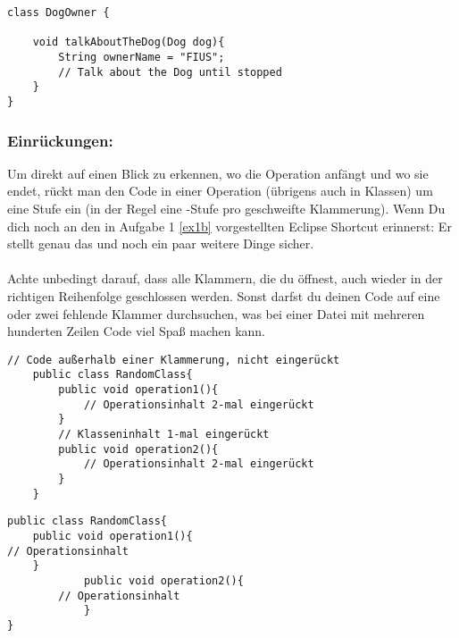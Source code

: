 \begin{lstlisting}[title=\textbf{Beispiel: Gute Namensgebung}]
class DogOwner {

	void talkAboutTheDog(Dog dog){
		String ownerName = "FIUS";
		// Talk about the Dog until stopped
	}
}
\end{lstlisting}

\subsubsection*{Einrückungen:}
Um direkt auf einen Blick zu erkennen, wo die Operation anfängt und wo sie endet, rückt man den Code in einer Operation (übrigens auch in Klassen) um eine Stufe ein (in der Regel eine -Stufe pro geschweifte Klammerung).\newline
Wenn Du dich noch an den in Aufgabe 1 \ref{ex1b} vorgestellten Eclipse Shortcut erinnerst: Er stellt genau das und noch ein paar weitere Dinge sicher.\\\\
\important Achte unbedingt darauf, dass alle Klammern, die du öffnest, auch wieder in der richtigen Reihenfolge geschlossen werden. Sonst darfst du deinen Code auf eine oder zwei fehlende Klammer durchsuchen, was bei einer Datei mit mehreren hunderten Zeilen Code viel Spaß machen kann.

\begin{lstlisting}[title=\textbf{Beispiel: Gute Einrückung}]
	// Code außerhalb einer Klammerung, nicht eingerückt
	public class RandomClass{
		public void operation1(){
			// Operationsinhalt 2-mal eingerückt
		}
		// Klasseninhalt 1-mal eingerückt
		public void operation2(){
			// Operationsinhalt 2-mal eingerückt
		}
	}
\end{lstlisting}

\begin{lstlisting}[title=\textbf{Beispiel: Schlechte Einrückung}]
	public class RandomClass{
	public void operation1(){
// Operationsinhalt
	}
			public void operation2(){
		// Operationsinhalt
			}
}
\end{lstlisting}
